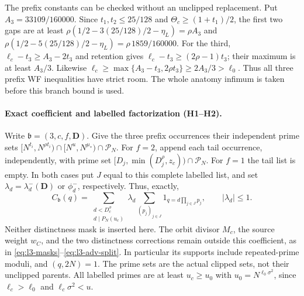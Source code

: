 The prefix constants can be checked without an unclipped replacement.
Put $A_3=33109/160000$. Since $t_1,t_2\le25/128$ and
$\Theta_c\ge(1+t_1)/2$, the first two gaps are at least
$\rho(1/2-3(25/128)/2-\eta_L)=\rho A_3$ and
$\rho(1/2-5(25/128)/2-\eta_L)=\rho\,1859/160000$.
For the third, $\ell_c-t_3\ge A_3-2t_3$ and retention gives
$\ell_c-t_3\ge(2\rho-1)t_3$; their maximum is at least $A_3/3$.
Likewise $\ell_c\ge\max\{A_3-t_3,2\rho t_3\}\ge2A_3/3>\ell_0$.
Thus all three prefix WF inequalities have strict room. The whole
anatomy infimum is taken before this branch bound is used.

\paragraph{Exact coefficient and labelled factorization (H1--H2).}
Write $\mathfrak b=(3,c,f,\mathbf D)$. Give the three prefix
occurrences their independent prime sets
$[N^{t_i},N^{\rho t_i})\cap[N^u,N^{\mu_*})\cap\mathcal P_N$.
For $f=2$, append each tail occurrence, independently, with prime set
$[D_j,\min(D_j^\rho,z_c))\cap\mathcal P_N$.
For $f=1$ the tail list is empty. In both cases put $J$ equal to this
complete labelled list, and set $\lambda_d=\lambda_d^-(\mathbf D)$
or $\phi_d^-$, respectively. Thus, exactly,
\[
 C_{\mathfrak b}(q)=\sum_{\substack{d<D_c^\sigma\\d\mid P_N(u_c)}}
 \lambda_d\sum_{(p_j)_{j\in J}}1_{q=d\prod_{j\in J}p_j},
 \qquad |\lambda_d|\le1 .
\]
Neither distinctness mask is inserted here. The orbit divisor $M_c$,
the source weight $w_C$, and the two distinctness corrections remain
outside this coefficient, as in \eqref{eq:l3-masks}--\eqref{eq:l3-adv-split}.
In particular its supports include repeated-prime moduli, and
$(q,2N)=1$. The prime sets are the actual clipped sets, not their
unclipped parents. All labelled primes are at least $u_c\ge u_0$
with $u_0=N^{\ell_0\sigma^2}$, since $\ell_c>\ell_0$ and
$\ell_c\sigma^2<u$.

